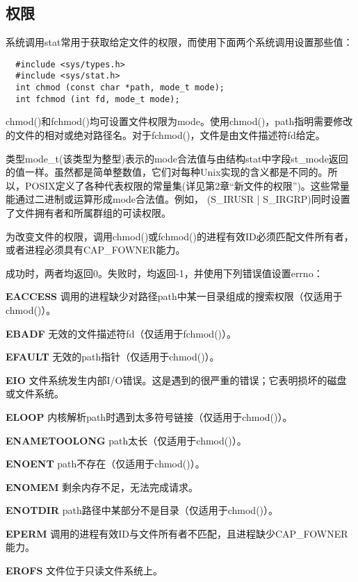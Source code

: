 \subsection{权限}

系统调用stat常用于获取给定文件的权限，而使用下面两个系统调用设置那些值：

\begin{lstlisting}
  #include <sys/types.h>
  #include <sys/stat.h>
  int chmod (const char *path, mode_t mode);
  int fchmod (int fd, mode_t mode);
\end{lstlisting}

chmod()和fchmod()均可设置文件权限为mode。使用chmod()，path指明需要修改的文件的相对或绝对路径名。对于fchmod()，文件是由文件描述符fd给定。

类型mode\_t(该类型为整型)表示的mode合法值与由结构stat中字段st\_mode返回的值一样。虽然都是简单整数值，它们对每种Unix实现的含义都是不同的。所以，POSIX定义了各种代表权限的常量集(详见第2章“新文件的权限”)。这些常量能通过二进制或运算形成mode合法值。例如， (S\_IRUSR | S\_IRGRP)同时设置了文件拥有者和所属群组的可读权限。

为改变文件的权限，调用chmod()或fchmod()的进程有效ID必须匹配文件所有者，或者进程必须具有CAP\_FOWNER能力。

成功时，两者均返回0。失败时，均返回-1，并使用下列错误值设置errno：

\begin{eqlist*}
\item[\textbf{EACCESS}] 调用的进程缺少对路径path中某一目录组成的搜索权限（仅适用于chmod()）。
\item[\textbf{EBADF}] 无效的文件描述符fd（仅适用于fchmod()）。
\item[\textbf{EFAULT}] 无效的path指针（仅适用于chmod()）。
\item[\textbf{EIO}] 文件系统发生内部I/O错误。这是遇到的很严重的错误；它表明损坏的磁盘或文件系统。
\item[\textbf{ELOOP}] 内核解析path时遇到太多符号链接（仅适用于chmod()）。
\item[\textbf{ENAMETOOLONG}] path太长（仅适用于chmod()）。
\item[\textbf{ENOENT}] path不存在（仅适用于chmod()）。
\item[\textbf{ENOMEM}] 剩余内存不足，无法完成请求。
\item[\textbf{ENOTDIR}] path路径中某部分不是目录（仅适用于chmod()）。
\item[\textbf{EPERM}] 调用的进程有效ID与文件所有者不匹配，且进程缺少CAP\_FOWNER能力。
\item[\textbf{EROFS}] 文件位于只读文件系统上。
\end{eqlist*}

